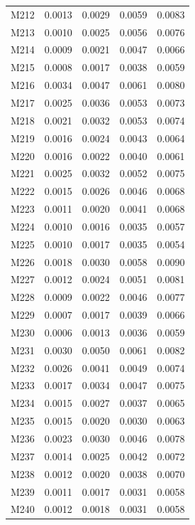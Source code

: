 \begin{longtable}{lrrrr}
M212 & 0.0013 & 0.0029 & 0.0059 & 0.0083 \\
M213 & 0.0010 & 0.0025 & 0.0056 & 0.0076 \\
M214 & 0.0009 & 0.0021 & 0.0047 & 0.0066 \\
M215 & 0.0008 & 0.0017 & 0.0038 & 0.0059 \\
M216 & 0.0034 & 0.0047 & 0.0061 & 0.0080 \\
M217 & 0.0025 & 0.0036 & 0.0053 & 0.0073 \\
M218 & 0.0021 & 0.0032 & 0.0053 & 0.0074 \\
M219 & 0.0016 & 0.0024 & 0.0043 & 0.0064 \\
M220 & 0.0016 & 0.0022 & 0.0040 & 0.0061 \\
M221 & 0.0025 & 0.0032 & 0.0052 & 0.0075 \\
M222 & 0.0015 & 0.0026 & 0.0046 & 0.0068 \\
M223 & 0.0011 & 0.0020 & 0.0041 & 0.0068 \\
M224 & 0.0010 & 0.0016 & 0.0035 & 0.0057 \\
M225 & 0.0010 & 0.0017 & 0.0035 & 0.0054 \\
M226 & 0.0018 & 0.0030 & 0.0058 & 0.0090 \\
M227 & 0.0012 & 0.0024 & 0.0051 & 0.0081 \\
M228 & 0.0009 & 0.0022 & 0.0046 & 0.0077 \\
M229 & 0.0007 & 0.0017 & 0.0039 & 0.0066 \\
M230 & 0.0006 & 0.0013 & 0.0036 & 0.0059 \\
M231 & 0.0030 & 0.0050 & 0.0061 & 0.0082 \\
M232 & 0.0026 & 0.0041 & 0.0049 & 0.0074 \\
M233 & 0.0017 & 0.0034 & 0.0047 & 0.0075 \\
M234 & 0.0015 & 0.0027 & 0.0037 & 0.0065 \\
M235 & 0.0015 & 0.0020 & 0.0030 & 0.0063 \\
M236 & 0.0023 & 0.0030 & 0.0046 & 0.0078 \\
M237 & 0.0014 & 0.0025 & 0.0042 & 0.0072 \\
M238 & 0.0012 & 0.0020 & 0.0038 & 0.0070 \\
M239 & 0.0011 & 0.0017 & 0.0031 & 0.0058 \\
M240 & 0.0012 & 0.0018 & 0.0031 & 0.0058 \\
\end{longtable}
